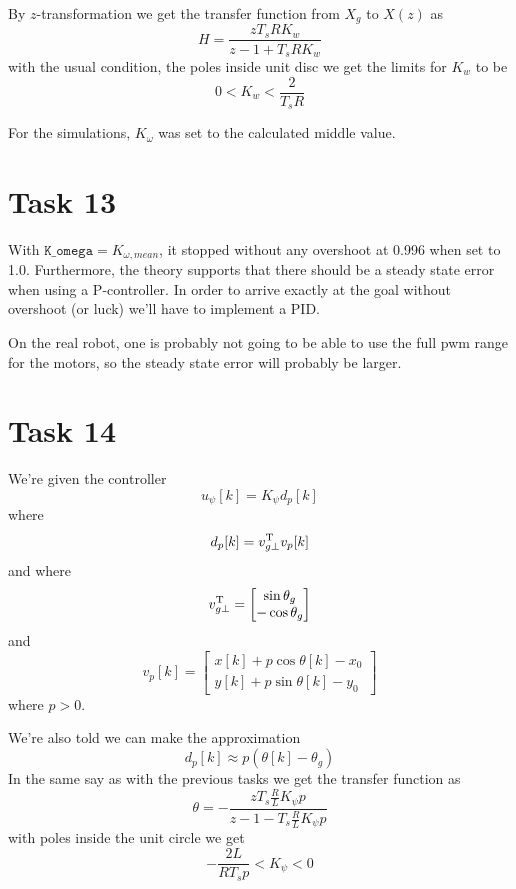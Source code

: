 \documentclass[a4paper,12pt,oneside,onecolumn]{article} %
\begin{document}
By $z$-transformation we get the transfer function from $X_g$ to $X(z)$ as
\begin{equation}
H = \frac{zT_s R K_w}{z -1 + T_sRK_w}
\end{equation}
with the usual condition, the poles inside unit disc we get the limits for $K_w$ to be
\begin{equation}
0 < K_w < \frac{2}{T_s R}
\end{equation}

For the simulations, $K_\omega$ was set to the calculated middle value.
\section*{Task 13}
With $\mathtt{K\_omega} = K_{\omega , mean}$, it stopped without any overshoot at 0.996 when set to 1.0. Furthermore, the theory supports that there should be a steady state error when using a P-controller. In order to arrive exactly at the goal without overshoot (or luck) we'll have to implement a PID.

On the real robot, one is probably not going to be able to use the full pwm range for the motors, so the steady state error will probably be larger.
\section*{Task 14}

We're given the controller 
\begin{equation}
u_\psi [k] = K_\psi d_p[k]
\end{equation}
where
\begin{equation}
d_p[k] = v_{g\perp}^{\rm T} v_p[k]
\end{equation}
and where
\begin{equation}
v_{g\perp}^{\rm T} = 
\begin{bmatrix}
\sin \theta_g \\ -\cos \theta_g
\end{bmatrix}
\end{equation}
and
\begin{equation}
\label{eq:vp}
v_p[k] = 
\begin{bmatrix}
x[k] + p \cos \theta[k] - x_0 \\ y[k] + p \sin \theta[k] - y_0
\end{bmatrix}
\end{equation}
where $p > 0$.

We're also told we can make the approximation
\begin{equation}
d_p[k] \approx p (\theta[k] - \theta_g)
\end{equation}
In the same say as with the previous tasks we get the transfer function as
\begin{equation}
\theta = - \frac{z T_s \frac{R}{L} K_\psi p}{z - 1 - T_s \frac{R}{L}K_\psi p}
\end{equation}
with poles inside the unit circle we get
\begin{equation}
- \frac{2L}{RT_s p} < K_\psi < 0
\end{equation}
\end{document}
